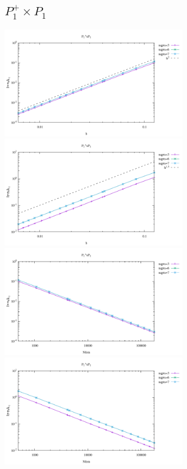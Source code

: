 \subsection*{$P_1^+\times P_1$}
\begin{center}
\includegraphics[width=8cm]{python_codes/fieldstone_120/results/P1+P1-velocity-h.pdf}
\includegraphics[width=8cm]{python_codes/fieldstone_120/results/P1+P1-pressure-h.pdf}
\includegraphics[width=8cm]{python_codes/fieldstone_120/results/P1+P1-velocity-Nfem.pdf}
\includegraphics[width=8cm]{python_codes/fieldstone_120/results/P1+P1-pressure-Nfem.pdf}
\end{center}

